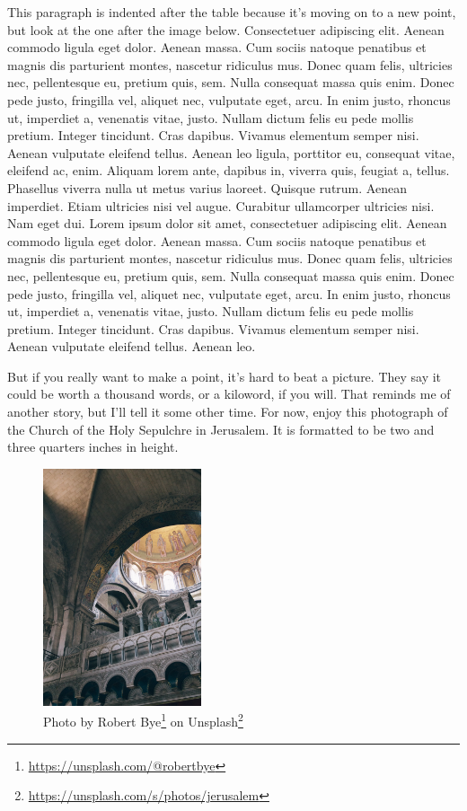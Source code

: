 \documentclass[
    12pt,
    letterpaper,
    oneside,
    noraggedright
]{turabian-researchpaper}
\DeclareRobustCommand{\href}[2]{#2\footnote{\url{#1}}}
\begin{document}
This paragraph is indented after the table because it's moving on to a
new point, but look at the one after the image below. Consectetuer
adipiscing elit. Aenean commodo ligula eget dolor. Aenean massa. Cum
sociis natoque penatibus et magnis dis parturient montes, nascetur
ridiculus mus. Donec quam felis, ultricies nec, pellentesque eu, pretium
quis, sem. Nulla consequat massa quis enim. Donec pede justo, fringilla
vel, aliquet nec, vulputate eget, arcu. In enim justo, rhoncus ut,
imperdiet a, venenatis vitae, justo. Nullam dictum felis eu pede mollis
pretium. Integer tincidunt. Cras dapibus. Vivamus elementum semper nisi.
Aenean vulputate eleifend tellus. Aenean leo ligula, porttitor eu,
consequat vitae, eleifend ac, enim. Aliquam lorem ante, dapibus in,
viverra quis, feugiat a, tellus. Phasellus viverra nulla ut metus varius
laoreet. Quisque rutrum. Aenean imperdiet. Etiam ultricies nisi vel
augue. Curabitur ullamcorper ultricies nisi. Nam eget dui. Lorem ipsum
dolor sit amet, consectetuer adipiscing elit. Aenean commodo ligula eget
dolor. Aenean massa. Cum sociis natoque penatibus et magnis dis
parturient montes, nascetur ridiculus mus. Donec quam felis, ultricies
nec, pellentesque eu, pretium quis, sem. Nulla consequat massa quis
enim. Donec pede justo, fringilla vel, aliquet nec, vulputate eget,
arcu. In enim justo, rhoncus ut, imperdiet a, venenatis vitae, justo.
Nullam dictum felis eu pede mollis pretium. Integer tincidunt. Cras
dapibus. Vivamus elementum semper nisi. Aenean vulputate eleifend
tellus. Aenean leo.

But if you really want to make a point, it's hard to beat a picture.
They say it could be worth a thousand words, or a kiloword, if you will.
That reminds me of another story, but I'll tell it some other time. For
now, enjoy this photograph of the Church of the Holy Sepulchre in
Jerusalem. It is formatted to be two and three quarters inches in
height.

\begin{figure}
\centering
\includegraphics[width=\textwidth,height=2.75in]{./images/robert-bye-W4V4vtq36NU-unsplash.jpg}
\caption{Photo by \href{https://unsplash.com/@robertbye}{Robert Bye} on
\href{https://unsplash.com/s/photos/jerusalem}{Unsplash}}
\end{figure}
\end{document}
